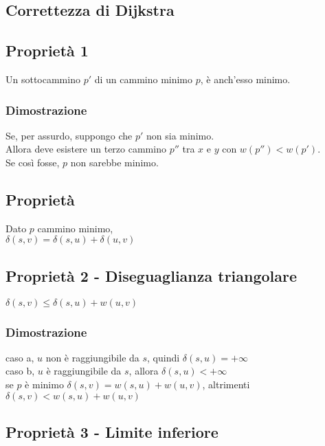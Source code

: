 \subsection{Correttezza di Dijkstra}

\subsection{Proprietà 1}

Un sottocammino $p'$ di un cammino minimo $p$, è anch'esso minimo.

\subsubsection{Dimostrazione}

Se, per assurdo, suppongo che $p'$ non sia minimo.\\
Allora deve esistere un terzo cammino $p''$ tra $x$ e $y$ con $w(p'') < w(p')$.\\
Se così fosse, $p$ non sarebbe minimo.

\subsection{Proprietà}

Dato $p$ cammino minimo, \\
$\delta(s,v)=\delta(s,u)+\delta(u,v)$ \\


\subsection{Proprietà 2 - Diseguaglianza triangolare}

$\delta(s,v)\leq \delta(s,u)+w(u,v)$ \\

\subsubsection{Dimostrazione}

caso a, $u$ non è raggiungibile da $s$, quindi $\delta(s,u) = +\infty$ \\
caso b, $u$ è raggiungibile da $s$, allora $\delta(s,u) < +\infty$ \\

se $p$ è minimo $\delta(s,v)=w(s,u)+w(u,v)$, altrimenti $\delta(s,v)<w(s,u)+w(u,v)$ \\


\subsection{Proprietà 3 - Limite inferiore}

